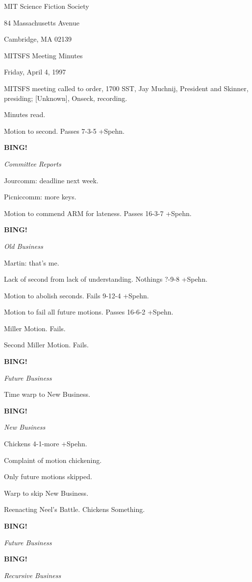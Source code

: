 \documentclass[12pt]{article}
\newcommand{\bing}{{\bf BING!} }
\newcommand{\goto}[1]{\bing \vskip 12pt \centerline{{\em{#1}}}}
\begin{document}
\begin{center}

MIT Science Fiction Society 

84 Massachusetts Avenue

Cambridge, MA 02139

\vspace{12pt}

MITSFS Meeting Minutes 

Friday, April 4, 1997

\end{center}
 
\vspace{18pt}

\setlength{\parskip}{6pt}

\noindent
MITSFS meeting called to order, 1700 SST,
Jay Muchnij, President and Skinner, presiding; [Unknown], Onseck, recording.

Minutes read.

Motion to second. Passes 7-3-5 +Spehn.

\goto{Committee Reports}

Jourcomm: deadline next week.

Picniccomm: more keys.

Motion to commend ARM for lateness. Passes 16-3-7 +Spehn.

\goto{Old Business}

Martin: that's me.

Lack of second from lack of understanding. Nothings ?-9-8 +Spehn.

Motion to abolish seconds. Fails 9-12-4 +Spehn.

Motion to fail all future motions. Passes 16-6-2 +Spehn.

Miller Motion. Fails.

Second Miller Motion. Fails.

\goto{Future Business}

Time warp to New Business.

\goto{New Business}

Chickens 4-1-more +Spehn.

Complaint of motion chickening.

Only future motions skipped.

Warp to skip New Business.

Reenacting Neel's Battle. Chickens Something.

\goto{Future Business}

\goto{Recursive Business}
\end{document}

